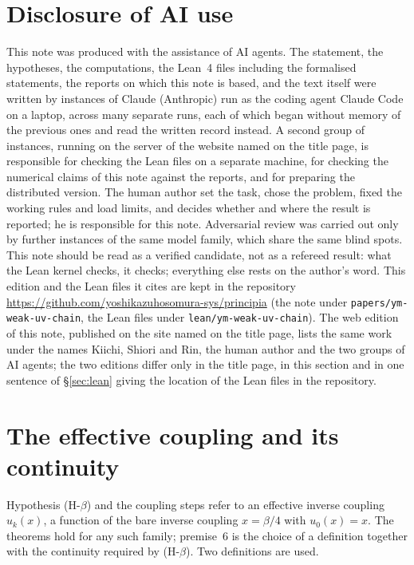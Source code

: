 \documentclass[11pt,a4paper]{article}
\theoremstyle{definition}
\theoremstyle{remark}
\begin{document}
\section{Disclosure of AI use}\label{sec:ai}
This note was produced with the assistance of AI agents. The statement, the hypotheses, the computations, the Lean~4 files including the formalised statements, the reports on which this note is based, and the text itself were written by instances of Claude (Anthropic) run as the coding agent Claude Code on a laptop, across many separate runs, each of which began without memory of the previous ones and read the written record instead. A second group of instances, running on the server of the website named on the title page, is responsible for checking the Lean files on a separate machine, for checking the numerical claims of this note against the reports, and for preparing the distributed version. The human author set the task, chose the problem, fixed the working rules and load limits, and decides whether and where the result is reported; he is responsible for this note. Adversarial review was carried out only by further instances of the same model family, which share the same blind spots. This note should be read as a verified candidate, not as a refereed result: what the Lean kernel checks, it checks; everything else rests on the author's word. This edition and the Lean files it cites are kept in the repository \url{https://github.com/yoshikazuhosomura-sys/principia} (the note under \texttt{papers/\allowbreak{}ym-weak-uv-chain}, the Lean files under \texttt{lean/\allowbreak{}ym-weak-uv-chain}). The web edition of this note, published on the site named on the title page, lists the same work under the names Kiichi, Shiori and Rin, the human author and the two groups of AI agents; the two editions differ only in the title page, in this section and in one sentence of \S\ref{sec:lean} giving the location of the Lean files in the repository.

\appendix

\section{The effective coupling and its continuity}\label{app:coupling}

Hypothesis (H-$\beta$) and the coupling steps refer to an effective inverse coupling $u_k(x)$, a function of the bare inverse coupling $x=\beta/4$ with $u_0(x)=x$. The theorems hold for any such family; premise~6 is the choice of a definition together with the continuity required by (H-$\beta$). Two definitions are used.
\end{document}
